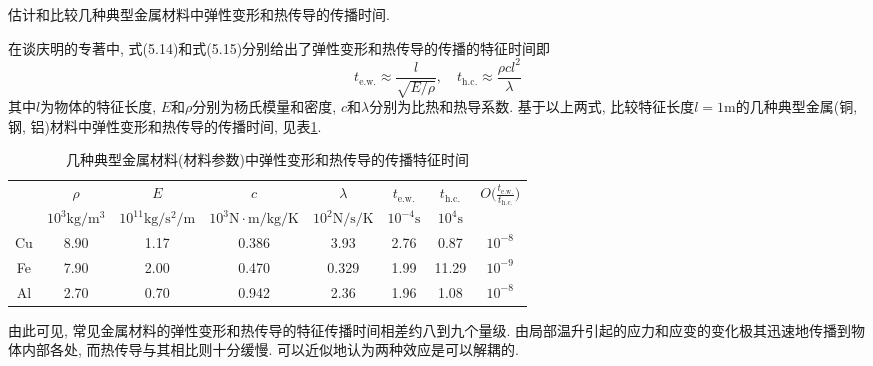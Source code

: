 \begin{problem}[29]
估计和比较几种典型金属材料中弹性变形和热传导的传播时间.
\end{problem}
\begin{solution}
在谈庆明的专著\cite{tan_dimensional_2011}中, 式(5.14)和式(5.15)分别给出了弹性变形和热传导的传播的特征时间即
\[
t_{\mathrm{e.w.}} \approx \frac{l}{\sqrt{E/\rho}},\quad t_{\mathrm{h.c.}} \approx \frac{\rho c l^2}{\lambda}
\]
其中$l$为物体的特征长度, $E$和$\rho$分别为杨氏模量和密度, $c$和$\lambda$分别为比热和热导系数. 基于以上两式, 比较特征长度$l=1\mathrm{m}$的几种典型金属(铜, 钢, 铝)材料中弹性变形和热传导的传播时间, 见表\ref{tab:metaltime}. 
\begin{table}[!htb]
\centering
\caption{\label{tab:metaltime}几种典型金属材料(材料参数\cite{materialsproperty})中弹性变形和热传导的传播特征时间}
{\small
\begin{tabular}{c|cccc|cc|c}
\hline 
 & $\rho$ & $E$ & $c$ & $\lambda$ & $t_{\mathrm{e.w.}}$ & $t_{\mathrm{h.c.}}$ & \multirow{2}{*}{${\displaystyle O\bigg(\frac{t_{\mathrm{e.w.}}}{t_{\mathrm{h.c.}}}\bigg)}$}\tabularnewline
 & $10^{3}\mathrm{kg/m^{3}}$ & $10^{11}\mathrm{kg/s^{2}/m}$ & $10^{3}\mathrm{N\cdot m/kg/K}$ & $10^{2}\mathrm{N/s/K}$ & $10^{-4}\mathrm{s}$ & $10^{4}\mathrm{s}$ & \tabularnewline
\hline 
Cu & 8.90 & 1.17 & 0.386 & 3.93 & 2.76 & 0.87 & $10^{-8}$\tabularnewline
Fe & 7.90 & 2.00 & 0.470 & 0.329 & 1.99 & 11.29 & $10^{-9}$\tabularnewline
Al & 2.70 & 0.70 & 0.942 & 2.36 & 1.96 & 1.08 & $10^{-8}$\tabularnewline
\hline 
\end{tabular}}
\end{table}
由此可见, 常见金属材料的弹性变形和热传导的特征传播时间相差约八到九个量级. 由局部温升引起的应力和应变的变化极其迅速地传播到物体内部各处, 而热传导与其相比则十分缓慢. 可以近似地认为两种效应是可以解耦的.
\end{solution}
